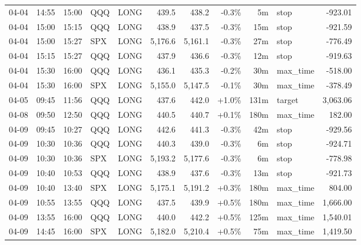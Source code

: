 \documentclass[11pt,a4paper,twoside]{article}
\begin{document}
\begin{center}
\begin{longtable}{>{\color{txtmain}}l l l l l r r r r >{\color{txtmain}}l r}
04-04 & 14:55 & 15:00 & QQQ & LONG & 439.5 & 438.2 & \textcolor{lossred}{-0.3\%} & 5m & stop & \textcolor{lossred}{-923.01} \\
04-04 & 15:00 & 15:15 & QQQ & LONG & 438.9 & 437.5 & \textcolor{lossred}{-0.3\%} & 15m & stop & \textcolor{lossred}{-921.59} \\
04-04 & 15:00 & 15:27 & SPX & LONG & 5,176.6 & 5,161.1 & \textcolor{lossred}{-0.3\%} & 27m & stop & \textcolor{lossred}{-776.49} \\
04-04 & 15:15 & 15:27 & QQQ & LONG & 437.9 & 436.6 & \textcolor{lossred}{-0.3\%} & 12m & stop & \textcolor{lossred}{-919.63} \\
04-04 & 15:30 & 16:00 & QQQ & LONG & 436.1 & 435.3 & \textcolor{lossred}{-0.2\%} & 30m & max\_time & \textcolor{lossred}{-518.00} \\
04-04 & 15:30 & 16:00 & SPX & LONG & 5,155.0 & 5,147.5 & \textcolor{lossred}{-0.1\%} & 30m & max\_time & \textcolor{lossred}{-378.49} \\
04-05 & 09:45 & 11:56 & QQQ & LONG & 437.6 & 442.0 & \textcolor{wingreen}{+1.0\%} & 131m & target & \textcolor{wingreen}{3,063.06} \\
04-08 & 09:50 & 12:50 & QQQ & LONG & 440.5 & 440.7 & \textcolor{wingreen}{+0.1\%} & 180m & max\_time & \textcolor{wingreen}{182.00} \\
04-09 & 09:45 & 10:27 & QQQ & LONG & 442.6 & 441.3 & \textcolor{lossred}{-0.3\%} & 42m & stop & \textcolor{lossred}{-929.56} \\
04-09 & 10:30 & 10:36 & QQQ & LONG & 440.3 & 439.0 & \textcolor{lossred}{-0.3\%} & 6m & stop & \textcolor{lossred}{-924.71} \\
04-09 & 10:30 & 10:36 & SPX & LONG & 5,193.2 & 5,177.6 & \textcolor{lossred}{-0.3\%} & 6m & stop & \textcolor{lossred}{-778.98} \\
04-09 & 10:40 & 10:53 & QQQ & LONG & 438.9 & 437.6 & \textcolor{lossred}{-0.3\%} & 13m & stop & \textcolor{lossred}{-921.73} \\
04-09 & 10:40 & 13:40 & SPX & LONG & 5,175.1 & 5,191.2 & \textcolor{wingreen}{+0.3\%} & 180m & max\_time & \textcolor{wingreen}{804.00} \\
04-09 & 10:55 & 13:55 & QQQ & LONG & 437.5 & 439.9 & \textcolor{wingreen}{+0.5\%} & 180m & max\_time & \textcolor{wingreen}{1,666.00} \\
04-09 & 13:55 & 16:00 & QQQ & LONG & 440.0 & 442.2 & \textcolor{wingreen}{+0.5\%} & 125m & max\_time & \textcolor{wingreen}{1,540.01} \\
04-09 & 14:45 & 16:00 & SPX & LONG & 5,182.0 & 5,210.4 & \textcolor{wingreen}{+0.5\%} & 75m & max\_time & \textcolor{wingreen}{1,419.50} \\

\end{longtable}
\end{center}
\end{document}
